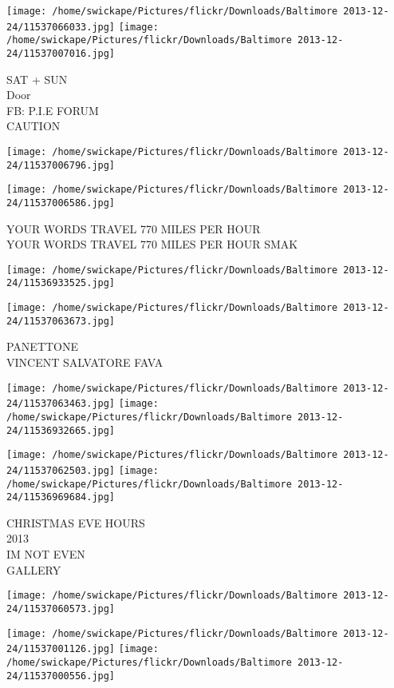 \documentclass[10pt,letterpaper]{article}
\begin{document}
\texttt{[image: /home/swickape/Pictures/flickr/Downloads/Baltimore 2013-12-24/11537066033.jpg]}
\texttt{[image: /home/swickape/Pictures/flickr/Downloads/Baltimore 2013-12-24/11537007016.jpg]}

SAT + SUN\\
Door\\
FB: P.I.E FORUM\\
CAUTION\\
\pagebreak

\texttt{[image: /home/swickape/Pictures/flickr/Downloads/Baltimore 2013-12-24/11537006796.jpg]}

\vspace{0.25in}
\texttt{[image: /home/swickape/Pictures/flickr/Downloads/Baltimore 2013-12-24/11537006586.jpg]}

YOUR WORDS TRAVEL 770 MILES PER HOUR\\
YOUR WORDS TRAVEL 770 MILES PER HOUR SMAK\\
\pagebreak

\texttt{[image: /home/swickape/Pictures/flickr/Downloads/Baltimore 2013-12-24/11536933525.jpg]}

\vspace{0.25in}
\texttt{[image: /home/swickape/Pictures/flickr/Downloads/Baltimore 2013-12-24/11537063673.jpg]}

PANETTONE\\
VINCENT SALVATORE FAVA\\
\pagebreak

\texttt{[image: /home/swickape/Pictures/flickr/Downloads/Baltimore 2013-12-24/11537063463.jpg]}
\texttt{[image: /home/swickape/Pictures/flickr/Downloads/Baltimore 2013-12-24/11536932665.jpg]}

\texttt{[image: /home/swickape/Pictures/flickr/Downloads/Baltimore 2013-12-24/11537062503.jpg]}
\texttt{[image: /home/swickape/Pictures/flickr/Downloads/Baltimore 2013-12-24/11536969684.jpg]}

CHRISTMAS EVE HOURS\\
2013\\
IM NOT EVEN\\
GALLERY\\
\pagebreak

\texttt{[image: /home/swickape/Pictures/flickr/Downloads/Baltimore 2013-12-24/11537060573.jpg]}

\vspace{0.25in}
\texttt{[image: /home/swickape/Pictures/flickr/Downloads/Baltimore 2013-12-24/11537001126.jpg]}
\texttt{[image: /home/swickape/Pictures/flickr/Downloads/Baltimore 2013-12-24/11537000556.jpg]}
\end{document}
